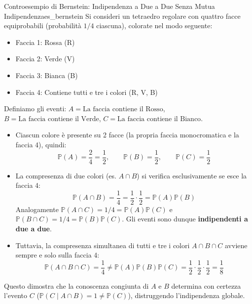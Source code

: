 \begin{esempio}{Controesempio di Bernstein: Indipendenza a Due a Due Senza Mutua Indipendenza}{es_bernstein}
Si consideri un tetraedro regolare con quattro facce equiprobabili (probabilità $1/4$ ciascuna), colorate nel modo seguente:
\begin{itemize}
    \item Faccia 1: Rossa (R)
    \item Faccia 2: Verde (V)
    \item Faccia 3: Bianca (B)
    \item Faccia 4: Contiene tutti e tre i colori (R, V, B)
\end{itemize}
Definiamo gli eventi:
$A = \text{La faccia contiene il Rosso}$, $B = \text{La faccia contiene il Verde}$, $C = \text{La faccia contiene il Bianco}$.
\begin{itemize}
    \item Ciascun colore è presente su 2 facce (la propria faccia monocromatica e la faccia 4), quindi:
    \begin{equation*}
        \mathbb{P}(A) = \frac{2}{4} = \frac{1}{2}, \qquad \mathbb{P}(B) = \frac{1}{2}, \qquad \mathbb{P}(C) = \frac{1}{2}
    \end{equation*}
    \item La compresenza di due colori (es. $A \cap B$) si verifica esclusivamente se esce la faccia 4:
    \begin{equation*}
        \mathbb{P}(A \cap B) = \frac{1}{4} = \frac{1}{2} \cdot \frac{1}{2} = \mathbb{P}(A)\mathbb{P}(B)
    \end{equation*}
    Analogamente $\mathbb{P}(A \cap C) = 1/4 = \mathbb{P}(A)\mathbb{P}(C)$ e $\mathbb{P}(B \cap C) = 1/4 = \mathbb{P}(B)\mathbb{P}(C)$. Gli eventi sono dunque \textbf{indipendenti a due a due}.
    \item Tuttavia, la compresenza simultanea di tutti e tre i colori $A \cap B \cap C$ avviene sempre e solo sulla faccia 4:
    \begin{equation*}
        \mathbb{P}(A \cap B \cap C) = \frac{1}{4} \neq \mathbb{P}(A)\mathbb{P}(B)\mathbb{P}(C) = \frac{1}{2} \cdot \frac{1}{2} \cdot \frac{1}{2} = \frac{1}{8}
    \end{equation*}
\end{itemize}
Questo dimostra che la conoscenza congiunta di $A$ e $B$ determina con certezza l'evento $C$ ($\mathbb{P}(C \mid A \cap B) = 1 \neq \mathbb{P}(C)$), distruggendo l'indipendenza globale.
\end{esempio}

